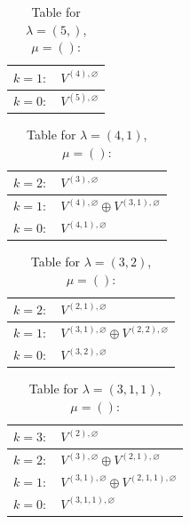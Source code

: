 \documentclass[a4paper,12pt]{article}
\begin{document}
\renewcommand{\arraystretch}{1.6} 
\begin{table}[H]
\centering
\caption{Table for $\lambda = (5,)$, $\mu = ()$:}
\begin{tabular}{|>{\centering\arraybackslash}p{15cm}|}
\hline
 $k = 1: \quad V^{(4), \varnothing} $ \\ \hline
 $k = 0: \quad V^{(5), \varnothing} $ \\ \hline
\end{tabular}
\end{table}

\renewcommand{\arraystretch}{1.6} 
\begin{table}[H]
\centering
\caption{Table for $\lambda = (4, 1)$, $\mu = ()$:}
\begin{tabular}{|>{\centering\arraybackslash}p{15cm}|}
\hline
 $k = 2: \quad V^{(3), \varnothing} $ \\ \hline
 $k = 1: \quad V^{(4), \varnothing} \oplus V^{(3, 1), \varnothing} $ \\ \hline
 $k = 0: \quad V^{(4, 1), \varnothing} $ \\ \hline
\end{tabular}
\end{table}

\renewcommand{\arraystretch}{1.6} 
\begin{table}[H]
\centering
\caption{Table for $\lambda = (3, 2)$, $\mu = ()$:}
\begin{tabular}{|>{\centering\arraybackslash}p{15cm}|}
\hline
 $k = 2: \quad V^{(2, 1), \varnothing} $ \\ \hline
 $k = 1: \quad V^{(3, 1), \varnothing} \oplus V^{(2, 2), \varnothing} $ \\ \hline
 $k = 0: \quad V^{(3, 2), \varnothing} $ \\ \hline
\end{tabular}
\end{table}

\renewcommand{\arraystretch}{1.6} 
\begin{table}[H]
\centering
\caption{Table for $\lambda = (3, 1, 1)$, $\mu = ()$:}
\begin{tabular}{|>{\centering\arraybackslash}p{15cm}|}
\hline
 $k = 3: \quad V^{(2), \varnothing} $ \\ \hline
 $k = 2: \quad V^{(3), \varnothing} \oplus V^{(2, 1), \varnothing} $ \\ \hline
 $k = 1: \quad V^{(3, 1), \varnothing} \oplus V^{(2, 1, 1), \varnothing} $ \\ \hline
 $k = 0: \quad V^{(3, 1, 1), \varnothing} $ \\ \hline
\end{tabular}
\end{table}
\end{document}
